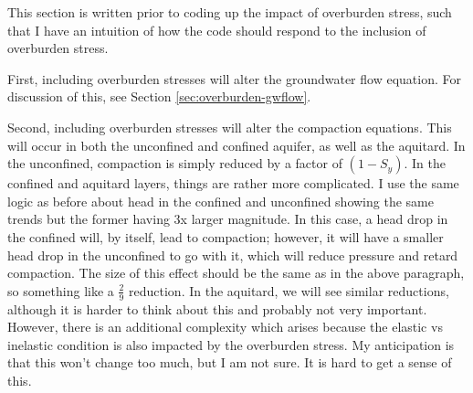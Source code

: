 \documentclass{article}
\begin{document}
This section is written prior to coding  up the impact of overburden stress, such that I have an intuition of how the code should respond to the inclusion of overburden stress. 

First, including overburden stresses will alter the groundwater flow equation. For discussion of this, see Section \ref{sec:overburden-gwflow}.


Second, including overburden stresses will alter the compaction equations. This will occur in both the unconfined and confined aquifer, as well as the aquitard. In the unconfined, compaction is simply reduced by a factor of $(1-S_y)$. In the confined and aquitard layers, things are rather more complicated. I use the same logic as before about head in the confined and unconfined showing the same trends but the former having 3x larger magnitude. In this case, a head drop in the confined will, by itself, lead to compaction; however, it will have a smaller head drop in the unconfined to go with it, which will reduce pressure and retard compaction. The size of this effect should be the same as in the above paragraph, so something like a $\frac{2}{9}$ reduction. In the aquitard, we will see similar reductions, although it is harder to think about this and probably not very important. However, there is an additional complexity which arises because the elastic vs inelastic condition is also impacted by the overburden stress. My anticipation is that this won't change too much, but I am not sure. It is hard to get a sense of this. 

\end{document}
